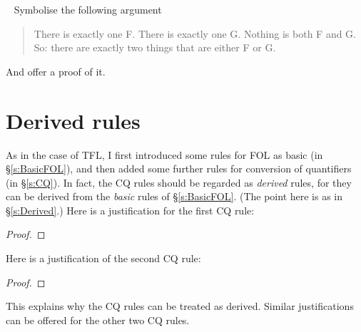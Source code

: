 \
\problempart
Symbolise the following argument
	\begin{quote}
		There is exactly one F. There is exactly one G. Nothing is both F and G. So: there are exactly two things that are either F or G.
	\end{quote}
And offer a proof of it.




\chapter{Derived rules}\label{s:DerivedFOL}
As in the case of TFL, I first introduced some rules for FOL as basic (in \S\ref{s:BasicFOL}), and then added some further rules for conversion of quantifiers (in \S\ref{s:CQ}). In fact, the CQ rules should be regarded as \emph{derived} rules, for they can be derived from the  \emph{basic} rules of \S\ref{s:BasicFOL}. (The point here is as in \S\ref{s:Derived}.) Here is a justification for the first CQ rule:
\begin{proof}
	\open
		\open
		\close
	\close
\end{proof}
Here is a justification of the second CQ rule:
\begin{proof}
	\open
		\open
		\close
	\close
\end{proof}
This explains why the CQ rules can be treated as derived. Similar justifications can be offered for the other two CQ rules. 

